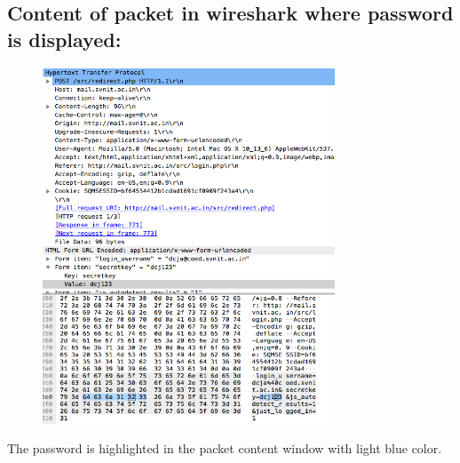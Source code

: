 \documentclass[]{report}
\begin{document}
\subsection{Content of packet in wireshark where password is displayed:}
\begin{figure}[H]
	\vspace{0pt}
	\includegraphics[height = 300pt, keepaspectratio]{Snapshots/q5/5_3.png}
\end{figure}
The password is highlighted in the packet content window with light blue color. 
\end{document}
